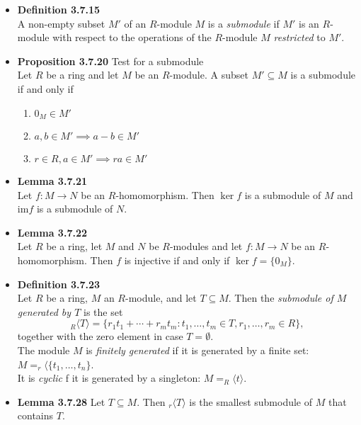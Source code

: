 \documentclass[11pt,a4paper]{article}
\begin{document}
\begin{itemize}
    \item \textbf{Definition 3.7.15} \\
        A non-empty subset $M'$ of an $R$-module $M$ is a \emph{submodule} if $M'$ is an $R$-module
        with respect to the operations of the $R$-module $M$ \emph{restricted} to $M'$.

    \item \textbf{Proposition 3.7.20} Test for a submodule \\
        Let $R$ be a ring and let $M$ be an $R$-module.
        A subset $M' \subseteq M$ is a submodule if and only if
        \begin{enumerate}
            \item $0_M \in M'$
            \item $a,b \in M' \implies a-b \in M'$
            \item $r \in R, a \in M' \implies ra \in M'$
        \end{enumerate}

    \item \textbf{Lemma 3.7.21} \\
        Let $f : M \to N$ be an $R$-homomorphism.
        Then $\ker f$ is a submodule of $M$ and $\mathrm{im} f$ is a submodule of $N$.

    \item \textbf{Lemma 3.7.22} \\
        Let $R$ be a ring, let $M$ and $N$ be $R$-modules and let $f : M \to N$ be an
        $R$-homomorphism.
        Then $f$ is injective if and only if $\ker f = \{0_M\}$.

    \item \textbf{Definition 3.7.23} \\
        Let $R$ be a ring, $M$ an $R$-module, and let $T \subseteq M$.
        Then the \emph{submodule of $M$ generated by $T$} is the set
        \[
            _R \langle T \rangle = \{{r_1}{t_1} + \cdots + {r_m}{t_m} : t_1, \ldots, t_m \in T,
            r_1, \ldots, r_m \in R \},
        \]
        together with the zero element in case $T = \emptyset$.\\
        The module $M$ is \emph{finitely generated} if it is generated by a finite set:
        $M = _r \langle \{ t_1, \ldots, t_n \}$. \\
        It is \emph{cyclic} f it is generated by a singleton:
        $M = _R \langle t \rangle$.

    \item \textbf{Lemma 3.7.28} Let $T \subseteq M$. Then $_r \langle T \rangle$
        is the smallest submodule of $M$ that contains $T$.


\end{itemize}
\end{document}
